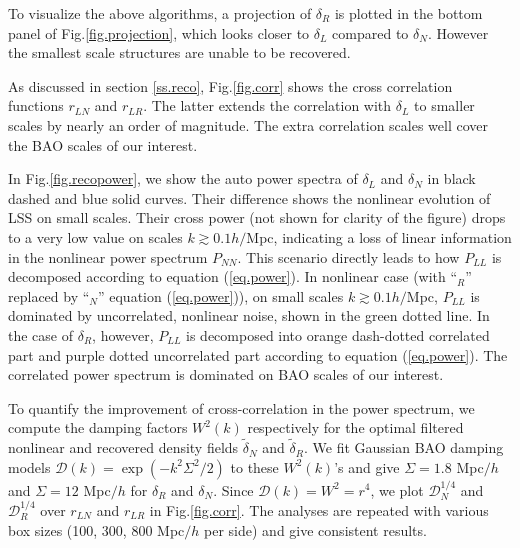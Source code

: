 \documentclass[aps,prd,twocolumn,superscriptaddress,amsfont,amssymb,amsmath,nofootinbib,showpacs,balancelastpage]{revtex4-1}
\begin{document}
To visualize the above algorithms, a projection of $\delta_R$ is plotted in
the bottom panel of Fig.\ref{fig.projection}, which looks closer to 
$\delta_L$ compared to $\delta_N$. However the smallest scale structures are unable
to be recovered.

As discussed in section \ref{ss.reco},
Fig.\ref{fig.corr} shows the cross correlation functions
$r_{LN}$ and $r_{LR}$. The latter extends the correlation
with $\delta_L$ to smaller scales by nearly an order of
magnitude. The extra correlation scales well cover the BAO
scales of our interest.

In Fig.\ref{fig.recopower}, we show the auto power spectra of
$\delta_L$ and $\delta_N$ in black dashed and blue solid curves.
Their difference shows the nonlinear evolution of LSS on 
small scales. Their cross power (not shown for clarity of the figure)
drops to a very low value on scales $k\gtrsim 0.1h/$Mpc,
indicating a loss of linear information in the
nonlinear power spectrum $P_{NN}$. This scenario directly
leads to how $P_{LL}$ is decomposed according to equation
(\ref{eq.power}). In nonlinear case (with ``$_R$'' replaced
by ``$_N$'' equation (\ref{eq.power})), on small
scales $k\gtrsim 0.1h/$Mpc, $P_{LL}$ is dominated by
uncorrelated, nonlinear noise, shown in the green
dotted line. In the case of $\delta_R$, however, $P_{LL}$
is decomposed into orange dash-dotted correlated
part and purple dotted uncorrelated part according to
equation (\ref{eq.power}). The correlated power spectrum
is dominated on BAO scales of our interest.

To quantify the improvement of cross-correlation in the power
spectrum, we compute the 
damping factors $W^2(k)$ respectively for the optimal filtered 
nonlinear and recovered density fields $\tilde\delta_N$
and $\tilde\delta_R$.
We fit Gaussian BAO damping models
${\mathcal D}(k)=\exp(-k^2\Sigma^2/2)$ to these $W^2(k)$'s
and give $\Sigma=1.8$ Mpc$/h$ and $\Sigma=12$ 
Mpc$/h$ for $\delta_R$ and $\delta_N$.
Since ${\mathcal D}(k)=W^2=r^4$, we plot
${\mathcal D}_N^{1/4}$ and ${\mathcal D}_R^{1/4}$
over $r_{LN}$ and $r_{LR}$ in Fig.\ref{fig.corr}.
The analyses are repeated with various box sizes (100, 300, 800 Mpc$/h$ per side)
and give consistent results.
\end{document}
